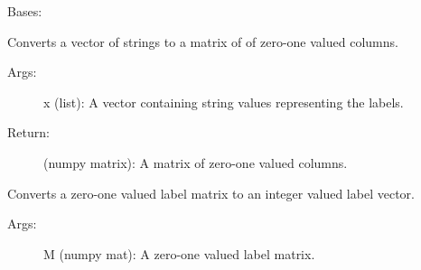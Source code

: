 \documentclass[letterpaper,10pt,english]{sphinxmanual}
\begin{document}
\begin{fulllineitems}
\label{\detokenize{KUHERD:KUHERD.LabelTransformer.LabelTransformer}}
Bases: 

\begin{fulllineitems}
\label{\detokenize{KUHERD:KUHERD.LabelTransformer.LabelTransformer.default_labels}}
\end{fulllineitems}


\begin{fulllineitems}
\label{\detokenize{KUHERD:KUHERD.LabelTransformer.LabelTransformer.label2mat}}
Converts a vector of strings to a matrix of of zero-one valued columns.
\begin{description}
\item[{Args:}] \leavevmode
x (list): A vector containing string values representing the labels.

\item[{Return:}] \leavevmode
(numpy matrix): A matrix of zero-one valued columns.

\end{description}

\end{fulllineitems}


\begin{fulllineitems}
\label{\detokenize{KUHERD:KUHERD.LabelTransformer.LabelTransformer.mat2vec}}
Converts a zero-one valued label matrix to an integer valued label vector.
\begin{description}
\item[{Args:}] \leavevmode
M (numpy mat): A zero-one valued label matrix.

\end{description}

\end{fulllineitems}



\end{fulllineitems}
\end{document}
